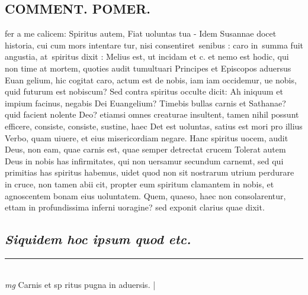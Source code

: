 \documentclass{article}
\begin{document}
\begin{pages}
\section*{COMMENT. POMER.  }\pstart fer a me calicem: Spiritus autem, Fiat uoluntas tua - Idem Susannae docet historia, cui cum mors intentare tur, nisi consentiret senibus : caro in summa fuit angustia, at spiritus dixit : Melius est, ut incidam et c.  et nemo est hodic, qui non time at mortem, quoties audit tumultuari Principes et Episcopos aduersus Euan gelium, hic cogitat caro, actum est de nobis, iam iam occidemur, ue nobis, quid futurum est nobiscum? Sed contra spiritus occulte dicit: Ah iniquum et impium facinus, negabis Dei Euangelium? Timebis bullas carnis et Sathanae? quid facient nolente Deo? etiamsi omnes creaturae insultent, tamen nihil possunt efficere, consiste, consiste, sustine, haec Det est uoluntas, satius est mori pro illius Verbo, quam uiuere, et eius misericordiam negare. Hanc spiritus uocem, audit Deus, non eam, quae carnis est, quae semper detrectat crucem Tolerat autem Deus in nobis has infirmitates, qui non uersamur secundum carnemt, sed qui primitias has spiritus habemus, uidet quod non sit nostrarum utrium perdurare in cruce, non tamen abii cit, propter eum spiritum clamantem in nobis, et agnoscentem bonam eius uoluntatem. Quem, quaeso, haec non consolarentur, ettam in profundissima inferni uoragine? sed exponit clarius quae dixit.   \pend
{}
{}
\subsection*{\textit{Siquidem hoc ipsum quod etc. }}
\vspace{0.5cm}\noindent
\vspace{0.2cm}\rule{1cm}{0.2pt}\\ 
\hspace{0.2cm}\textit{mg}
\footnotesize Carnis et sp ritus pugna in aduersis. 
\normalsize| 

\end{pages}
\end{document}
